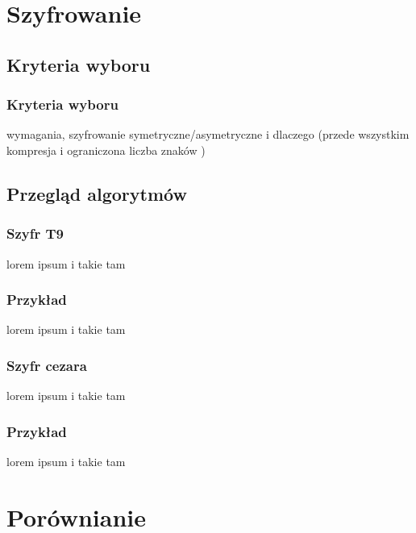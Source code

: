 \documentclass[xcolor=table]{beamer}
\begin{document}
\section{Szyfrowanie}

\subsection{Kryteria wyboru}
\begin{frame}
  \frametitle{Kryteria wyboru}

 wymagania, szyfrowanie symetryczne/asymetryczne i dlaczego (przede wszystkim kompresja i ograniczona liczba znaków )

\end{frame}


\subsection{Przegląd algorytmów}


\begin{frame}
  \frametitle{Szyfr T9}

lorem ipsum i takie tam

\end{frame}

\begin{frame}
  \frametitle{Przykład}

lorem ipsum i takie tam

\end{frame}

\begin{frame}
  \frametitle{Szyfr cezara}

lorem ipsum i takie tam

\end{frame}

\begin{frame}
  \frametitle{Przykład}

lorem ipsum i takie tam

\end{frame}

\section{Porównianie}
\end{document}
